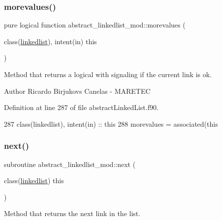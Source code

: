 \subsubsection{\texorpdfstring{morevalues()}{morevalues()}}
{\footnotesize\ttfamily pure logical function abstract\+\_\+linkedlist\+\_\+mod\+::morevalues (\begin{DoxyParamCaption}\item[{class(\mbox{\hyperlink{structabstract__linkedlist__mod_1_1linkedlist}{linkedlist}}), intent(in)}]{this }\end{DoxyParamCaption})\hspace{0.3cm}{\ttfamily [private]}}



Method that returns a logical with signaling if the current link is ok. 

\begin{DoxyAuthor}{Author}
Ricardo Birjukovs Canelas -\/ M\+A\+R\+E\+T\+EC 
\end{DoxyAuthor}


Definition at line 287 of file abstract\+Linked\+List.\+f90.


\begin{DoxyCode}
287     \textcolor{keywordtype}{class}(linkedlist), \textcolor{keywordtype}{intent(in)} :: this
288     morevalues = \textcolor{keyword}{associated}(this%
\end{DoxyCode}
\mbox{\label{namespaceabstract__linkedlist__mod_a576f148096561712d6ddd8c848bc7c4b}} 
\subsubsection{\texorpdfstring{next()}{next()}}
{\footnotesize\ttfamily subroutine abstract\+\_\+linkedlist\+\_\+mod\+::next (\begin{DoxyParamCaption}\item[{class(\mbox{\hyperlink{structabstract__linkedlist__mod_1_1linkedlist}{linkedlist}})}]{this }\end{DoxyParamCaption})\hspace{0.3cm}{\ttfamily [private]}}



Method that returns the next link in the list. 

